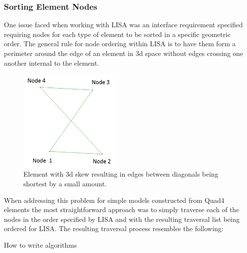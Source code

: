 \subsubsection{Sorting Element Nodes}
One issue faced when working with LISA was an interface requirement specified requiring nodes for each type of element to be sorted in a specific geometric order. The general rule for node ordering within LISA is to have them form a perimeter around the edge of an element in 3d space without edges crossing one another internal to the element. \\

\begin{figure}[!h]
  \centerline{\includegraphics[width=50mm , scale=1]{../Graphics/BadlyOrderedNodes.png}}
  \caption{Element with 3d skew resulting in edges between diagonals being shortest by a small amount.
  }
  \label{fig:h-refinementImp}
\end{figure}

\noindent
When addressing this problem for simple models constructed from Quad4 elements the most straightforward approach was to simply traverse each of the nodes in the order specified by LISA and with the resulting traversal list being ordered for LISA. The resulting traversal process resembles the following: \\


\begin{algorithm}[H]
 \caption{How to write algorithms}
\end{algorithm}

